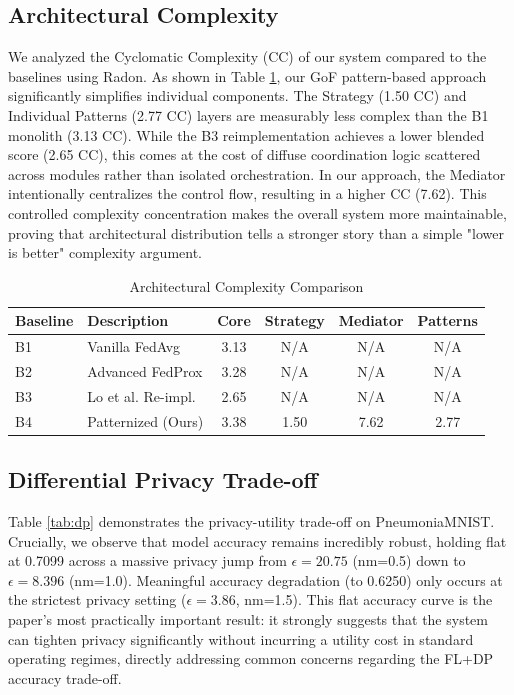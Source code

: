 \documentclass[10pt, conference]{IEEEtran}
\begin{document}
\subsection{Architectural Complexity}
We analyzed the Cyclomatic Complexity (CC) of our system compared to the baselines using Radon. As shown in Table \ref{tab:complexity}, our GoF pattern-based approach significantly simplifies individual components. The Strategy (1.50 CC) and Individual Patterns (2.77 CC) layers are measurably less complex than the B1 monolith (3.13 CC). While the B3 reimplementation achieves a lower blended score (2.65 CC), this comes at the cost of diffuse coordination logic scattered across modules rather than isolated orchestration. In our approach, the Mediator intentionally centralizes the control flow, resulting in a higher CC (7.62). This controlled complexity concentration makes the overall system more maintainable, proving that architectural distribution tells a stronger story than a simple "lower is better" complexity argument.

\begin{table}[h]
\centering
\caption{Architectural Complexity Comparison}
\label{tab:complexity}
\begin{tabular}{llcccc}
\toprule
\textbf{Baseline} & \textbf{Description} & \textbf{Core} & \textbf{Strategy} & \textbf{Mediator} & \textbf{Patterns} \\
\midrule
B1 & Vanilla FedAvg & 3.13 & N/A & N/A & N/A \\
B2 & Advanced FedProx & 3.28 & N/A & N/A & N/A \\
B3 & Lo et al. Re-impl. & 2.65 & N/A & N/A & N/A \\
B4 & Patternized (Ours) & 3.38 & 1.50 & 7.62 & 2.77 \\
\bottomrule
\end{tabular}
\end{table}

\subsection{Differential Privacy Trade-off}
Table \ref{tab:dp} demonstrates the privacy-utility trade-off on PneumoniaMNIST. Crucially, we observe that model accuracy remains incredibly robust, holding flat at 0.7099 across a massive privacy jump from $\epsilon = 20.75$ (nm=0.5) down to $\epsilon = 8.396$ (nm=1.0). Meaningful accuracy degradation (to 0.6250) only occurs at the strictest privacy setting ($\epsilon = 3.86$, nm=1.5). This flat accuracy curve is the paper's most practically important result: it strongly suggests that the system can tighten privacy significantly without incurring a utility cost in standard operating regimes, directly addressing common concerns regarding the FL+DP accuracy trade-off.
\end{document}

